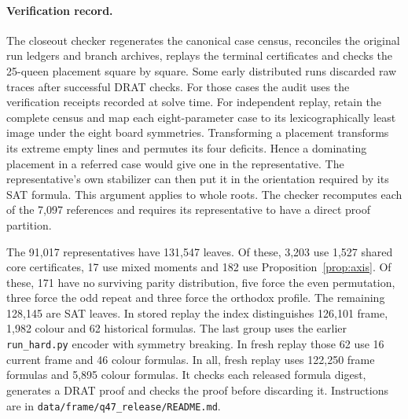 \documentclass[11pt]{article}
\newcommand{\file}[1]{\nolinkurl{#1}}
\begin{document}
\paragraph{Verification record.}
The closeout checker regenerates the canonical case census, reconciles
the original run ledgers and branch archives, replays the terminal
certificates and checks the 25-queen placement square by square. Some
early distributed runs discarded raw traces after successful DRAT checks.
For those cases the audit uses the verification receipts recorded at
solve time. For independent replay, retain the complete census and map each
eight-parameter case to its lexicographically least image under the eight
board symmetries. Transforming a placement transforms its extreme empty
lines and permutes its four deficits. Hence a dominating placement in a
referred case would give one in the representative. The representative's
own stabilizer can then put it in the orientation required by its SAT
formula. This argument applies to whole roots. The checker recomputes
each of the 7,097 references and requires its representative to have a
direct proof partition.

The 91,017 representatives have 131,547 leaves. Of these, 3,203 use
1,527 shared core certificates, 17 use mixed moments and 182 use
Proposition~\ref{prop:axis}. Of these, 171 have no surviving parity distribution,
five force the even permutation, three force the odd repeat and three
force the orthodox profile. The remaining 128,145 are SAT leaves.
In stored replay the index distinguishes 126,101 frame, 1,982 colour
and 62 historical formulas. The last group uses the earlier
\file{run_hard.py} encoder with symmetry breaking. In fresh replay those
62 use 16 current frame and 46 colour formulas. In all, fresh replay
uses 122,250 frame formulas and 5,895 colour formulas. It checks each
released formula digest, generates a DRAT proof and checks the proof
before discarding it. Instructions are in
\file{data/frame/q47_release/README.md}.
\end{document}
